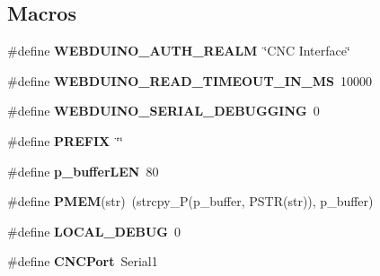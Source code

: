 \subsection*{Macros}
\begin{DoxyCompactItemize}
\item 
\hypertarget{_c_n_c_interface_8ino_a2643cc289538c19d186c11188d399f52}{\#define {\bfseries W\-E\-B\-D\-U\-I\-N\-O\-\_\-\-A\-U\-T\-H\-\_\-\-R\-E\-A\-L\-M}~\char`\"{}C\-N\-C Interface\char`\"{}}\label{_c_n_c_interface_8ino_a2643cc289538c19d186c11188d399f52}

\item 
\hypertarget{_c_n_c_interface_8ino_aedac7dabfc622c6885eb62833d5fddc1}{\#define {\bfseries W\-E\-B\-D\-U\-I\-N\-O\-\_\-\-R\-E\-A\-D\-\_\-\-T\-I\-M\-E\-O\-U\-T\-\_\-\-I\-N\-\_\-\-M\-S}~10000}\label{_c_n_c_interface_8ino_aedac7dabfc622c6885eb62833d5fddc1}

\item 
\hypertarget{_c_n_c_interface_8ino_aee451f96d13d733ff157a2fdadab7c73}{\#define {\bfseries W\-E\-B\-D\-U\-I\-N\-O\-\_\-\-S\-E\-R\-I\-A\-L\-\_\-\-D\-E\-B\-U\-G\-G\-I\-N\-G}~0}\label{_c_n_c_interface_8ino_aee451f96d13d733ff157a2fdadab7c73}

\item 
\hypertarget{_c_n_c_interface_8ino_add51b53e8b628f95078327028dccb20c}{\#define {\bfseries P\-R\-E\-F\-I\-X}~\char`\"{}\char`\"{}}\label{_c_n_c_interface_8ino_add51b53e8b628f95078327028dccb20c}

\item 
\hypertarget{_c_n_c_interface_8ino_a2f133484946dae5ec6ded09bd0d8c0e5}{\#define {\bfseries p\-\_\-buffer\-L\-E\-N}~80}\label{_c_n_c_interface_8ino_a2f133484946dae5ec6ded09bd0d8c0e5}

\item 
\hypertarget{_c_n_c_interface_8ino_a33701e025b57e5037b5f2cdd09abeb47}{\#define {\bfseries P\-M\-E\-M}(str)~(strcpy\-\_\-\-P(p\-\_\-buffer, P\-S\-T\-R(str)), p\-\_\-buffer)}\label{_c_n_c_interface_8ino_a33701e025b57e5037b5f2cdd09abeb47}

\item 
\hypertarget{_c_n_c_interface_8ino_acaa88f3e37e6e5af2643c4475a8779c7}{\#define {\bfseries L\-O\-C\-A\-L\-\_\-\-D\-E\-B\-U\-G}~0}\label{_c_n_c_interface_8ino_acaa88f3e37e6e5af2643c4475a8779c7}

\item 
\hypertarget{_c_n_c_interface_8ino_aa02fe35355ffeccd92b8f1e0012fc05a}{\#define {\bfseries C\-N\-C\-Port}~Serial1}\label{_c_n_c_interface_8ino_aa02fe35355ffeccd92b8f1e0012fc05a}

\end{DoxyCompactItemize}
